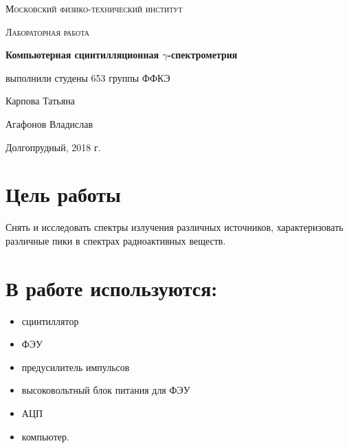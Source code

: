 \documentclass[a4paper]{article}
\begin{document}
\begin{titlepage}
	\centering
	\vspace{5cm}
	{\scshape\LARGE Московский физико-технический институт \par}
	\vspace{4cm}
	{\scshape\Large Лабораторная работа \par}
	\vspace{1cm}
	{\huge\bfseries Компьютерная сцинтилляционная $\gamma$-спектрометрия \par}
	\vspace{1cm}
	\vfill
\begin{flushright}
	{\large выполнили студены 653 группы ФФКЭ}\par
	\vspace{0.3cm}
	{\LARGE Карпова Татьяна} \par
	{\LARGE Агафонов Владислав} \par

\end{flushright}
	

	\vfill

	Долгопрудный, 2018 г.
\end{titlepage}

\section{Цель работы}
Снять и исследовать спектры излучения различных источников, характеризовать различные пики в спектрах радиоактивных веществ.

\section{В работе используются:}
\begin{itemize}
    \item сцинтиллятор
    \item ФЭУ
    \item предусилитель импульсов
    \item высоковольтный блок питания для ФЭУ
    \item АЦП
    \item компьютер.
\end{itemize}
\end{document}
